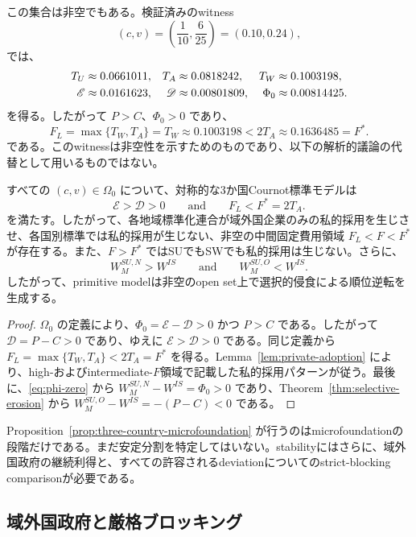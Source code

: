 この集合は非空でもある。検証済みのwitness
\begin{equation}
    (c,v)=\left(\frac{1}{10},\frac{6}{25}\right)=(0.10,0.24),
    \label{eq:omega-witness}
\end{equation}
では、
\begin{align}
    T_U&\approx0.0661011,&
    T_A&\approx0.0818242,&
    T_W&\approx0.1003198,\notag\\
    \mathscr E&\approx0.0161623,&
    \mathscr D&\approx0.00801809,&
    \Phi_0&\approx0.00814425.
    \label{eq:omega-witness-values}
\end{align}
を得る。したがって $P>C$、$\Phi_0>0$ であり、
\[
    F_L=\max\{T_W,T_A\}=T_W\approx0.1003198
    <2T_A\approx0.1636485=F^\ast.
\]
である。このwitnessは非空性を示すためのものであり、以下の解析的議論の代替として用いるものではない。

\begin{proposition}[3か国モデルによるmicrofoundation]
\label{prop:three-country-microfoundation}
すべての $(c,v)\in\Omega_0$ について、対称的な3か国Cournot標準モデルは
\[
    \mathscr E>\mathscr D>0
    \qquad\text{and}\qquad
    F_L<F^\ast=2T_A.
\]
を満たす。したがって、各地域標準化連合が域外国企業のみの私的採用を生じさせ、各国別標準では私的採用が生じない、非空の中間固定費用領域 $F_L<F<F^\ast$ が存在する。また、$F>F^\ast$ ではSUでもSWでも私的採用は生じない。さらに、
\[
    W_M^{SU,N}>W^{IS}
    \qquad\text{and}\qquad
    W_M^{SU,O}<W^{IS}.
\]
したがって、primitive modelは非空のopen set上で選択的侵食による順位逆転を生成する。
\end{proposition}

\begin{proof}
$\Omega_0$ の定義により、$\Phi_0=\mathscr E-\mathscr D>0$ かつ $P>C$ である。したがって $\mathscr D=P-C>0$ であり、ゆえに $\mathscr E>\mathscr D>0$ である。同じ定義から $F_L=\max\{T_W,T_A\}<2T_A=F^\ast$ を得る。Lemma~\ref{lem:private-adoption} により、high-およびintermediate-$F$領域で記載した私的採用パターンが従う。最後に、\eqref{eq:phi-zero} から $W_M^{SU,N}-W^{IS}=\Phi_0>0$ であり、Theorem~\ref{thm:selective-erosion} から $W_M^{SU,O}-W^{IS}=-(P-C)<0$ である。
\end{proof}

Proposition~\ref{prop:three-country-microfoundation} が行うのはmicrofoundationの段階だけである。まだ安定分割を特定してはいない。stabilityにはさらに、域外国政府の継続利得と、すべての許容されるdeviationについてのstrict-blocking comparisonが必要である。

\subsection{域外国政府と厳格ブロッキング}
\label{subsec:outsider-strict-blocking}

